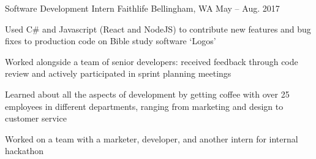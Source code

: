 

\begin{cventries}

  \cventry
    {Software Development Intern} %
    {Faithlife} %
    {Bellingham, WA} %
    {May – Aug. 2017} %
    {
      \begin{cvitems} %
        \item {Used C\# and Javascript (React and NodeJS) to contribute new features and bug fixes to production code on Bible study software `Logos'}
        \item {Worked alongside a team of senior developers: received feedback through code review and actively participated in sprint planning meetings}
        \item {Learned about all the aspects of development by getting coffee with over 25 employees in different departments, ranging from marketing and design to customer service}
        \item {Worked on a team with a marketer, developer, and another intern for internal hackathon}
      \end{cvitems}
    }

\end{cventries}
